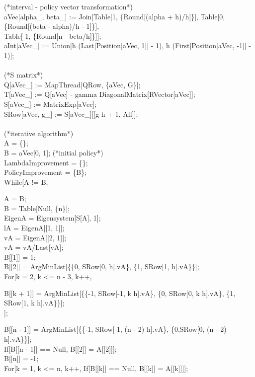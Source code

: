 \begin{scriptsize}
\begin{addmargin}[1em]{0em}
  (*interval - policy vector  transformation*)\\
  aVec[alpha\_, beta\_] := Join[Table[1, \{Round[(alpha + h)/h]\}], Table[0, \{Round[(beta - alpha)/h - 1]\}],\\ 
    Table[-1, \{Round[n - beta/h]\}]];\\
  aInt[aVec\_] :=  Union[h (Last[Position[aVec, 1]] - 1), h (First[Position[aVec, -1]] - 1)];\\
  \\
  (*S matrix*)\\
  Q[aVec\_] := MapThread[QRow, \{aVec, G\}];\\
  T[aVec\_] := Q[aVec] - gamma DiagonalMatrix[RVector[aVec]];\\
  S[aVec\_] := MatrixExp[aVec];\\
  SRow[aVec, g\_] := S[aVec\_][[g h + 1, All]];\\
  \\
  (*iterative algorithm*)\\
  A = \{\};\\
  B = aVec[0, 1]; (*initial policy*)\\
  LambdaImprovement = \{\};\\
  PolicyImprovement = \{B\};\\
  While[A != B,
     \begin{addmargin}[1em]{0em}
     A = B;\\
     B = Table[Null, \{n\}];\\
     EigenA = Eigensystem[S[A], 1];\\
     lA = EigenA[[1, 1]];\\
     vA = EigenA[[2, 1]];\\
     vA = vA/Last[vA];\\
     B[[1]] = 1;\\
     B[[2]] = ArgMinList[\{\{0, SRow[0, h].vA\}, \{1, SRow[1, h].vA\}\}];\\
     For[k = 2, k <= n - 3, k++,
      \begin{addmargin}[1em]{0em}
      B[[k + 1]] = ArgMinList[\{\{-1, SRow[-1, k h].vA\}, \{0, SRow[0, k h].vA\}, \{1, SRow[1, k h].vA\}\}];\\
      ];
      \end{addmargin}
     B[[n - 1]] = ArgMinList[\{\{-1, SRow[-1, (n - 2) h].vA\}, \{0,SRow[0, (n - 2) h].vA\}\}];\\
     If[B[[n - 1]] == Null, B[[2]] = A[[2]]];\\
     B[[n]] = -1;\\
     For[k = 1, k <= n, k++, If[B[[k]] == Null, B[[k]] = A[[k]]]];\\

\end{addmargin}
\end{addmargin}
\end{scriptsize}
